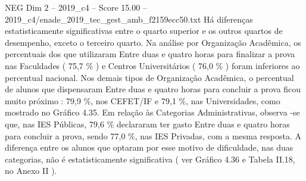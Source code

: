 \begin{textsample}{NEG Dim 2 – 2019\_c4 – Score 15.00 – 2019\_c4/enade\_2019\_tec\_gest\_amb\_f2159ecc50.txt}
Há diferenças estatisticamente significativas entre o quarto superior e os outros quartos de desempenho, exceto o terceiro quarto.
Na análise por Organização Acadêmica, os percentuais dos que utilizaram Entre duas e quatro horas para finalizar a prova nas Faculdades ( 75,7 \% ) e Centros Universitários ( 76,0 \% ) foram inferiores ao percentual nacional.
Nos demais tipos de Organização Acadêmica, o percentual de alunos que dispensaram Entre duas e quatro horas para concluir a prova ficou muito próximo : 79,9 \%, nos CEFET/IF e 79,1 \%, nas Universidades, como mostrado no Gráfico 4.35.
Em relação às Categorias Administrativas, observa -se que, nas IES Públicas, 79,6 \% declararam ter gasto Entre duas e quatro horas para concluir a prova, sendo 77,0 \%, nas IES Privadas, com a mesma resposta.
A diferença entre os alunos que optaram por esse motivo de dificuldade, nas duas categorias, não é estatisticamente significativa ( ver Gráfico 4.36 e Tabela II.18, no Anexo II ).

\end{textsample}
